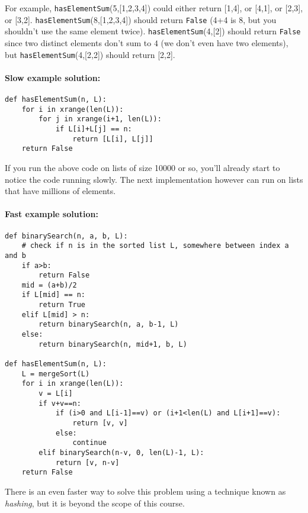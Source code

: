\documentclass[11pt]{article}
\begin{document}
For example, \texttt{hasElementSum}(5,[1,2,3,4]) could either return
[1,4], or [4,1], or [2,3], or [3,2].
\texttt{hasElementSum}(8,[1,2,3,4]) should return \texttt{False} (4+4
is 8, but you shouldn't use the same element twice).
\texttt{hasElementSum}(4,[2]) should return \texttt{False} since two
distinct elements don't sum to $4$ (we don't even have two elements),
but \texttt{hasElementSum}(4,[2,2]) should return [2,2].

\paragraph{Slow example solution:}
\begin{verbatim}
def hasElementSum(n, L):
	for i in xrange(len(L)):
		for j in xrange(i+1, len(L)):
			if L[i]+L[j] == n:
				return [L[i], L[j]]
	return False
\end{verbatim}

If you run the above code on lists of size 10000 or so, you'll already
start to notice the code running slowly.  The next implementation
however can run on lists that have millions of elements.

\paragraph{Fast example solution:}
\begin{verbatim}
def binarySearch(n, a, b, L):
    # check if n is in the sorted list L, somewhere between index a and b
    if a>b:
        return False
    mid = (a+b)/2
    if L[mid] == n:
        return True
    elif L[mid] > n:
        return binarySearch(n, a, b-1, L)
    else:
        return binarySearch(n, mid+1, b, L)

def hasElementSum(n, L):
    L = mergeSort(L)
    for i in xrange(len(L)):
        v = L[i]
        if v+v==n:
            if (i>0 and L[i-1]==v) or (i+1<len(L) and L[i+1]==v):
                return [v, v]
            else:
                continue
        elif binarySearch(n-v, 0, len(L)-1, L):
            return [v, n-v]
    return False
\end{verbatim}

There is an even faster way to solve this problem using a technique
known as {\em hashing}, but it is beyond the scope of this course.
\end{document}
